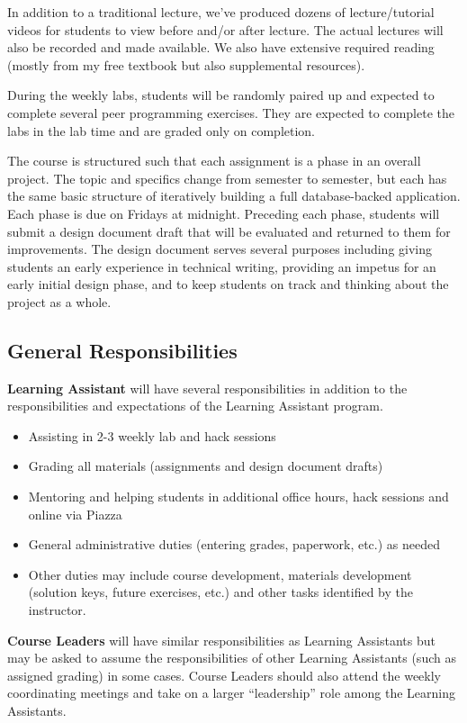 \documentclass[12pt]{scrartcl}
\begin{document}
In addition to a traditional lecture, we've produced dozens of 
lecture/tutorial videos for students to view before and/or after lecture. 
The actual lectures will also be recorded and made available.
We also have extensive required reading (mostly from my free textbook but 
also supplemental resources).  

During the weekly labs, students will be randomly paired up and 
expected to complete several peer programming exercises.  They are 
expected to complete the labs in the lab time and are graded only on 
completion.

The course is structured such that each assignment is a phase in an
overall project.  The topic and specifics change from semester to 
semester, but each has the same basic structure of iteratively
building a full database-backed application.  Each phase is due on
Fridays at midnight.  Preceding each phase, students will submit a
design document draft that will be evaluated and returned to them
for improvements.  The design document serves several purposes including
giving students an early experience in technical writing, providing
an impetus for an early initial design phase, and to keep students 
on track and thinking about the project as a whole.

\subsection*{General Responsibilities}

\textbf{Learning Assistant} will have several responsibilities in 
addition to the responsibilities and expectations of the Learning 
Assistant program.

\begin{itemize}
  \item Assisting in 2-3 weekly lab and hack sessions
  \item Grading all materials (assignments and design document drafts)
  \item Mentoring and helping students in additional office hours, hack sessions
  and online via Piazza
  \item General administrative duties (entering grades, paperwork, etc.) as needed
  \item Other duties may include course development, materials development 
  (solution keys, future exercises, etc.) and other tasks identified by the instructor.
\end{itemize}

\textbf{Course Leaders} will have similar responsibilities as Learning
Assistants but may be asked to assume the responsibilities of other
Learning Assistants (such as assigned grading) in some cases.  Course
Leaders should also attend the weekly coordinating meetings and take
on a larger ``leadership'' role among the Learning Assistants.
\end{document}
